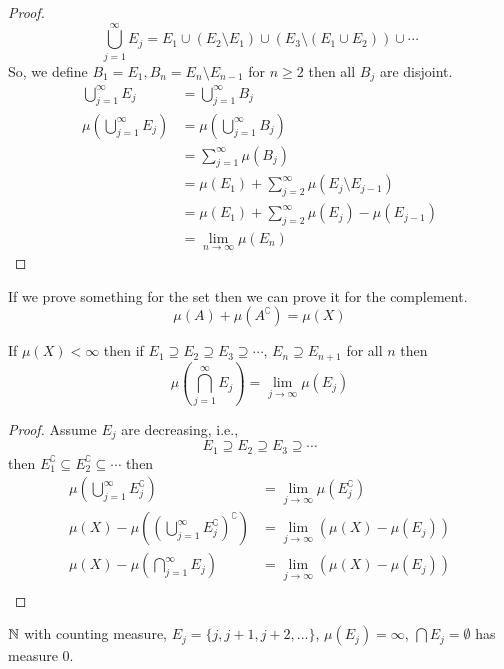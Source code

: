 \begin{proof}
$$\bigcup_{j=1}^\infty E_j = E_1 \cup (E_2 \setminus E_1) \cup (E_3 \setminus (E_1 \cup E_2)) \cup \dotsm$$
So, we define $B_1 = E_1, B_n = E_n \setminus E_{n-1}$ for $n \ge 2$ then all $B_j$ are disjoint.
\begin{align*}
  \bigcup_{j=1}^\infty E_j &= \bigcup_{j=1}^\infty B_j \\
  \mu\left(\bigcup_{j=1}^\infty E_j\right)&= \mu\left(\bigcup_{j=1}^\infty B_j\right) \\
  &= \sum_{j=1}^\infty \mu(B_j) \\
  &= \mu(E_1) + \sum_{j=2}^\infty \mu(E_j \setminus E_{j-1}) \\
  &= \mu(E_1) + \sum_{j=2}^\infty \mu(E_j) - \mu(E_{j-1}) \\
  &= \lim_{n\to\infty} \mu(E_n)
\end{align*}
\end{proof}
\begin{remark}
  If we prove something for the set then we can prove it for the complement.
  \[\mu(A) + \mu(A^\complement) = \mu(X)\]
\end{remark}

\begin{theorem}\label{lem:continuity-from-above}
  If $\mu(X) < \infty$ then if $E_1 \supseteq E_2 \supseteq E_3 \supseteq \dotsm$, $E_n \supseteq E_{n+1}$ for all $n$ then
  \[\mu\left(\bigcap_{j=1}^\infty E_j\right) = \lim_{j \to \infty} \mu(E_j)\] 
\end{theorem}

\begin{proof}
  Assume $E_j$ are decreasing, i.e.,
  \[E_1 \supseteq E_2 \supseteq E_3 \supseteq \dotsm \]
  then $E_1^\complement \subseteq E_2^\complement \subseteq \dotsm$ then
  \begin{align*}
  \mu\left(\bigcup_{j=1}^\infty E_j^\complement\right) &= \lim_{j \to \infty} \mu(E_j^\complement) \\
  \mu(X) - \mu\left(\left(\bigcup_{j=1}^\infty E_j^\complement\right)^\complement\right) &= \lim_{j \to \infty}( \mu(X) - \mu(E_j) )\\
  \mu(X) - \mu\left(\bigcap_{j=1}^\infty E_j\right) &= \lim_{j \to \infty} (\mu(X) - \mu(E_j)) \\
  \end{align*}
\end{proof}

\begin{example}
  $\mathbb N$ with counting measure, $E_{j} = \{j, j+1, j+2, \dotsc\}$, $\mu(E_j) = \infty$,
  $\bigcap{E_j} = \emptyset$ has measure 0.
\end{example}

